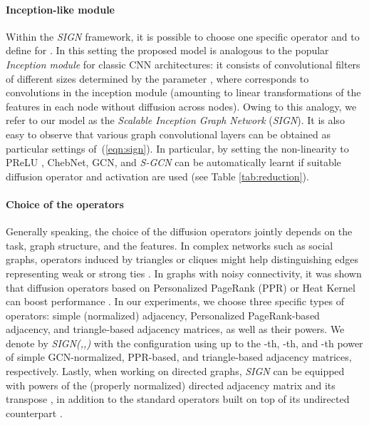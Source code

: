 \documentclass{article}
\begin{document}
\paragraph{Inception-like module}
Within the \textit{SIGN} framework, it is possible to choose one specific operator  and to define  for . In this setting the proposed model is analogous to the popular {\em Inception module} \cite{szegedy2015going} for classic CNN architectures: it consists of convolutional filters of different sizes determined by the parameter , where  corresponds to  convolutions in the inception module (amounting to linear transformations of the features in each node without diffusion across nodes).
Owing to this analogy, we refer to our model as the \emph{Scalable Inception Graph Network} (\textit{SIGN}).
It is also easy to observe  that various graph convolutional layers can be obtained as particular settings of~(\ref{eqn:sign}). In particular, by setting the  non-linearity to PReLU \cite{prelu}, ChebNet, GCN, and \textit{S-GCN} can be automatically learnt if suitable diffusion operator  and activation  are used (see Table \ref{tab:reduction}).
 
\paragraph{Choice of the operators}
Generally speaking, the choice of the diffusion operators jointly depends on the task, graph structure, and the features. 
In complex networks such as social graphs, operators induced by triangles or cliques might help distinguishing edges representing weak or strong ties \cite{Granovetter82thestrength}. In graphs with noisy connectivity, it was shown that diffusion operators based on Personalized PageRank (PPR) or Heat Kernel can boost performance \citep{klicpera_diffusion_2019}. In our experiments, we choose three specific types of operators: simple (normalized) adjacency, Personalized PageRank-based adjacency, and triangle-based adjacency matrices, as well as their powers. 
We denote by {\em SIGN(,,)} with  the configuration using up to the -th, -th, and -th power of simple GCN-normalized, PPR-based, and triangle-based adjacency matrices, respectively.
Lastly, when working on directed graphs, \textit{SIGN} can be equipped with powers of the (properly normalized) directed adjacency matrix  and its transpose , in addition to the standard operators built on top of its undirected counterpart .
\end{document}
